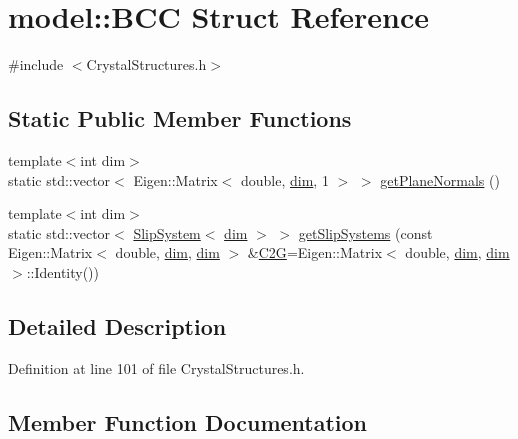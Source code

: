 \hypertarget{structmodel_1_1_b_c_c}{}\section{model\+:\+:B\+C\+C Struct Reference}
\label{structmodel_1_1_b_c_c}


{\ttfamily \#include $<$Crystal\+Structures.\+h$>$}

\subsection*{Static Public Member Functions}
\begin{DoxyCompactItemize}
\item 
{\footnotesize template$<$int dim$>$ }\\static std\+::vector$<$ Eigen\+::\+Matrix$<$ double, \hyperlink{plot_nd_a_8m_a382f3ca768b275b8d563604f7fc7df73}{dim}, 1 $>$ $>$ \hyperlink{structmodel_1_1_b_c_c_aae83893d2ecbf2d39d387dd763328d27}{get\+Plane\+Normals} ()
\item 
{\footnotesize template$<$int dim$>$ }\\static std\+::vector$<$ \hyperlink{structmodel_1_1_slip_system}{Slip\+System}$<$ \hyperlink{plot_nd_a_8m_a382f3ca768b275b8d563604f7fc7df73}{dim} $>$ $>$ \hyperlink{structmodel_1_1_b_c_c_a1d957721a57e1fd2f5e5eef6c8a3dc61}{get\+Slip\+Systems} (const Eigen\+::\+Matrix$<$ double, \hyperlink{plot_nd_a_8m_a382f3ca768b275b8d563604f7fc7df73}{dim}, \hyperlink{plot_nd_a_8m_a382f3ca768b275b8d563604f7fc7df73}{dim} $>$ \&\hyperlink{crystal_rotation_8m_a91d1e9da78391186478a7911c79460ad}{C2\+G}=Eigen\+::\+Matrix$<$ double, \hyperlink{plot_nd_a_8m_a382f3ca768b275b8d563604f7fc7df73}{dim}, \hyperlink{plot_nd_a_8m_a382f3ca768b275b8d563604f7fc7df73}{dim} $>$\+::Identity())
\end{DoxyCompactItemize}


\subsection{Detailed Description}


Definition at line 101 of file Crystal\+Structures.\+h.



\subsection{Member Function Documentation}
\hypertarget{structmodel_1_1_b_c_c_aae83893d2ecbf2d39d387dd763328d27}{}
